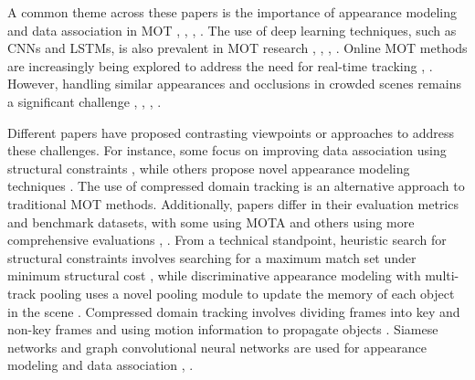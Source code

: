 \documentclass[conference]{IEEEtran}
\begin{document}
A common theme across these papers is the importance of appearance modeling and data association in MOT \cite{Multiple Object Tracking in Recent Times: A Literature Review}, \cite{Multiple Object Tracking: A Literature Review}, \cite{Heuristic Search for Structural Constraints in Data Association}, \cite{Discriminative Appearance Modeling with Multi-track Pooling for Real-time Multi-object Tracking}. The use of deep learning techniques, such as CNNs and LSTMs, is also prevalent in MOT research \cite{Multiple Object Tracking in Recent Times: A Literature Review}, \cite{Multiple Object Tracking: A Literature Review}, \cite{Real-time Online Multi-Object Tracking in Compressed Domain}, \cite{Discriminative Appearance Modeling with Multi-track Pooling for Real-time Multi-object Tracking}. Online MOT methods are increasingly being explored to address the need for real-time tracking \cite{Real-time Online Multi-Object Tracking in Compressed Domain}, \cite{Discriminative Appearance Modeling with Multi-track Pooling for Real-time Multi-object Tracking}. However, handling similar appearances and occlusions in crowded scenes remains a significant challenge \cite{Multiple Object Tracking in Recent Times: A Literature Review}, \cite{Multiple Object Tracking: A Literature Review}, \cite{Heuristic Search for Structural Constraints in Data Association}, \cite{Discriminative Appearance Modeling with Multi-track Pooling for Real-time Multi-object Tracking}.

Different papers have proposed contrasting viewpoints or approaches to address these challenges. For instance, some focus on improving data association using structural constraints \cite{Heuristic Search for Structural Constraints in Data Association}, while others propose novel appearance modeling techniques \cite{Discriminative Appearance Modeling with Multi-track Pooling for Real-time Multi-object Tracking}. The use of compressed domain tracking \cite{Real-time Online Multi-Object Tracking in Compressed Domain} is an alternative approach to traditional MOT methods. Additionally, papers differ in their evaluation metrics and benchmark datasets, with some using MOTA \cite{Heuristic Search for Structural Constraints in Data Association} and others using more comprehensive evaluations \cite{Multiple Object Tracking in Recent Times: A Literature Review}, \cite{Multiple Object Tracking: A Literature Review}. From a technical standpoint, heuristic search for structural constraints involves searching for a maximum match set under minimum structural cost \cite{Heuristic Search for Structural Constraints in Data Association}, while discriminative appearance modeling with multi-track pooling uses a novel pooling module to update the memory of each object in the scene \cite{Discriminative Appearance Modeling with Multi-track Pooling for Real-time Multi-object Tracking}. Compressed domain tracking involves dividing frames into key and non-key frames and using motion information to propagate objects \cite{Real-time Online Multi-Object Tracking in Compressed Domain}. Siamese networks and graph convolutional neural networks are used for appearance modeling and data association \cite{Multiple Object Tracking in Recent Times: A Literature Review}, \cite{Multiple Object Tracking: A Literature Review}.
\end{document}

